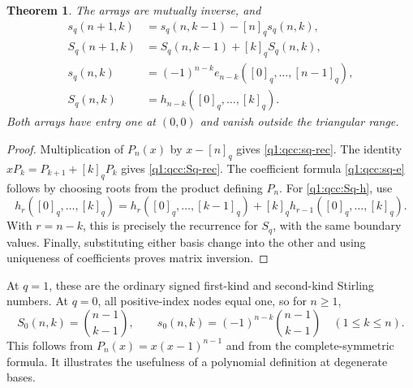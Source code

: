 \documentclass[11pt,a4paper,oneside,openany]{book}
\newtheorem{theorem}{Theorem}[chapter]
\theoremstyle{definition}
\theoremstyle{remark}
\begin{document}
\begin{theorem}\label{q1:qcc:qstirling-basic}
The arrays are mutually inverse, and
\begin{align}
 s_q(n+1,k)&=s_q(n,k-1)-[n]_qs_q(n,k),\label{q1:qcc:sq-rec}\\
 S_q(n+1,k)&=S_q(n,k-1)+[k]_qS_q(n,k),\label{q1:qcc:Sq-rec}\\
 s_q(n,k)&=(-1)^{n-k}e_{n-k}([0]_q,\ldots,[n-1]_q),\label{q1:qcc:sq-e}\\
 S_q(n,k)&=h_{n-k}([0]_q,\ldots,[k]_q).\label{q1:qcc:Sq-h}
\end{align}
Both arrays have entry one at \((0,0)\) and vanish outside the triangular range.
\end{theorem}
\begin{proof}
Multiplication of \(P_n(x)\) by \(x-[n]_q\) gives
\eqref{q1:qcc:sq-rec}. The identity \(xP_k=P_{k+1}+[k]_qP_k\) gives
\eqref{q1:qcc:Sq-rec}. The coefficient formula \eqref{q1:qcc:sq-e} follows by
choosing roots from the product defining \(P_n\).
For \eqref{q1:qcc:Sq-h}, use
\[
 h_r([0]_q,\ldots,[k]_q)
 =h_r([0]_q,\ldots,[k-1]_q)+[k]_qh_{r-1}([0]_q,\ldots,[k]_q).
\]
With \(r=n-k\), this is precisely the recurrence for \(S_q\), with the same
boundary values. Finally, substituting either basis change into the other and
using uniqueness of coefficients proves matrix inversion.
\end{proof}
At \(q=1\), these are the ordinary signed first-kind and second-kind Stirling
numbers. At \(q=0\), all positive-index nodes equal one, so for \(n\ge1\),
\[
 S_0(n,k)=\binom{n-1}{k-1},\qquad
 s_0(n,k)=(-1)^{n-k}\binom{n-1}{k-1}\quad(1\le k\le n).
\]
This follows from \(P_n(x)=x(x-1)^{n-1}\) and from the complete-symmetric
formula. It illustrates the usefulness of a polynomial definition at degenerate
bases.
\end{document}
